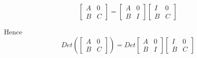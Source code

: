 \[
   \left[
      \begin{array}{c|c}
         A & 0 \\
         \hline
         B & C 
     \end{array}
   \right] = 
   \left[
      \begin{array}{c|c}
         A & 0 \\
         \hline
         B & I 
     \end{array}
   \right]  
   \left[
      \begin{array}{c|c}
         I & 0 \\
         \hline
         B & C 
     \end{array}
   \right]
\] 

Hence
\[
   Det \left( \left[
      \begin{array}{c|c}
         A & 0 \\
         \hline
         B & C 
     \end{array}
   \right]  \right) =
   Det 
   \left[
      \begin{array}{c|c}
         A & 0 \\
         \hline
         B & I 
     \end{array}
   \right]  
   \left[
      \begin{array}{c|c}
         I & 0 \\
         \hline
         B & C 
     \end{array}
   \right]
\] 




